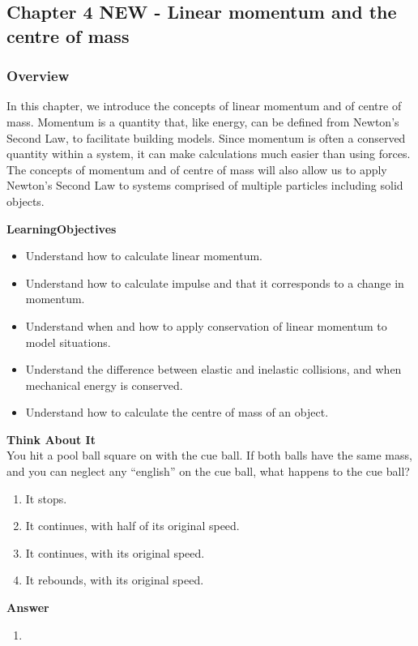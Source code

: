 \subsection{Chapter 4 NEW - Linear momentum and the centre of mass}

\subsubsection{Overview}\label{chap:momentumandcm}

In this chapter, we introduce the concepts of linear momentum and of centre of mass. Momentum is a quantity that, like energy, can be defined from Newton's Second Law, to facilitate building models. Since momentum is often a conserved quantity within a system, it can make calculations much easier than using forces. The concepts of momentum and of centre of mass will also allow us to apply Newton's Second Law to systems comprised of multiple particles including solid objects.

\begin{framed}
\textbf{LearningObjectives}\\
\begin{itemize}
\item Understand how to calculate linear momentum.
\item Understand how to calculate impulse and that it corresponds to a change in momentum.
\item Understand when and how to apply conservation of linear momentum to model situations.
\item Understand the difference between elastic and inelastic collisions, and when mechanical energy is conserved.
\item Understand how to calculate the centre of mass of an object.
\end{itemize}
\end{framed}

\begin{framed}
\textbf{Think About It}\\
You hit a pool ball square on with the cue ball. If both balls have the same mass, and you can neglect any ``english'' on the cue ball, what happens to the cue ball?

\begin{enumerate}
\item It stops.
\item It continues, with half of its original speed.
\item It continues, with its original speed.
\item It rebounds, with its original speed.
\end{enumerate}

\begin{framed}
\textbf{Answer}\\
\begin{enumerate}
\item
\end{enumerate}
\end{framed}
\end{framed}


